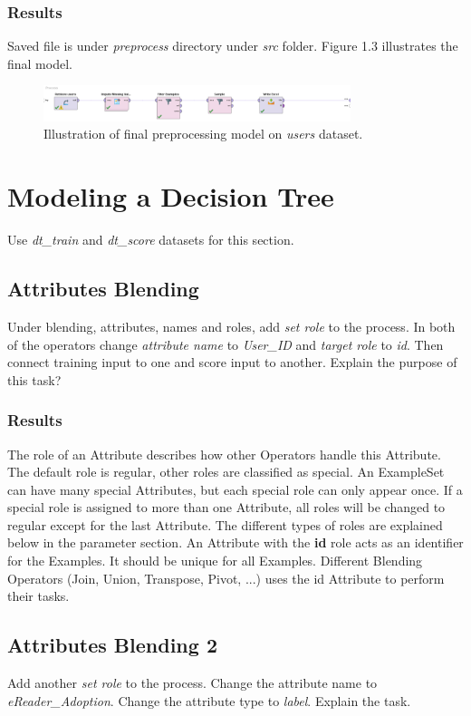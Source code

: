 \documentclass[12pt]{article}
\numberwithin{equation}{section}
\numberwithin{table}{section}
\numberwithin{figure}{section}
\begin{document}
\subsubsection*{Results}
Saved file is under \textit{preprocess} directory under \textit{src} folder. Figure 1.3 illustrates the final model.
\begin{figure}[!h]\centering
	\includegraphics[width=0.8\textwidth]{3_preprocess_final.png}
	\caption{Illustration of final preprocessing model on \textit{users} dataset.}
	\label{pl1} 
\end{figure}

\section{Modeling a Decision Tree}
Use \textit{dt\_train} and \textit{dt\_score} datasets for this section.

\subsection*{Attributes Blending}
Under blending, attributes, names and roles, add \textit{set role} to the process. In both of the operators change \textit{attribute name} to \textit{User\_ID} and \textit{target role} to \textit{id}. Then connect training input to one and score input to another. Explain the purpose of this task?
\subsubsection*{Results}
The role of an Attribute describes how other Operators handle this Attribute. The default role is regular, other roles are classified as special. An ExampleSet can have many special Attributes, but each special role can only appear once. If a special role is assigned to more than one Attribute, all roles will be changed to regular except for the last Attribute. The different types of roles are explained below in the parameter section. An Attribute with the \textbf{id} role acts as an identifier for the Examples. It should be unique for all Examples. Different Blending Operators (Join, Union, Transpose, Pivot, ...) uses the id Attribute to perform their tasks.

\subsection*{Attributes Blending 2}
Add another \textit{set role} to the process. Change the attribute name to \textit{eReader\_Adoption}. Change the attribute type to \textit{label}. Explain the task.
\end{document}
